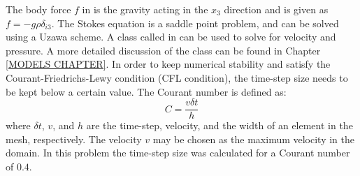 %
%
%
%
The body force $f$ in  is the gravity acting in
the $x_{3}$ direction and is given as $f=-g\rho\delta_{i3}$.
The Stokes equation is a saddle point problem, and can be solved using a Uzawa scheme.
A class called  in \escript can be used to solve
for velocity and pressure. A more detailed discussion of the class can be
found in Chapter \ref{MODELS CHAPTER}.
In order to keep numerical stability and satisfy the Courant-Friedrichs-Lewy condition (CFL condition), the
time-step size needs to be kept below a certain value.
The Courant number  is defined as:
%
\begin{equation}
C = \frac{v \delta t}{h}
\label{COURANT}
\end{equation}
%
where $\delta t$, $v$, and $h$ are the time-step, velocity, and the width of
an element in the mesh, respectively. The velocity $v$ may be chosen as the
maximum velocity in the domain. In this problem the time-step size was
calculated for a Courant number of $0.4$.

